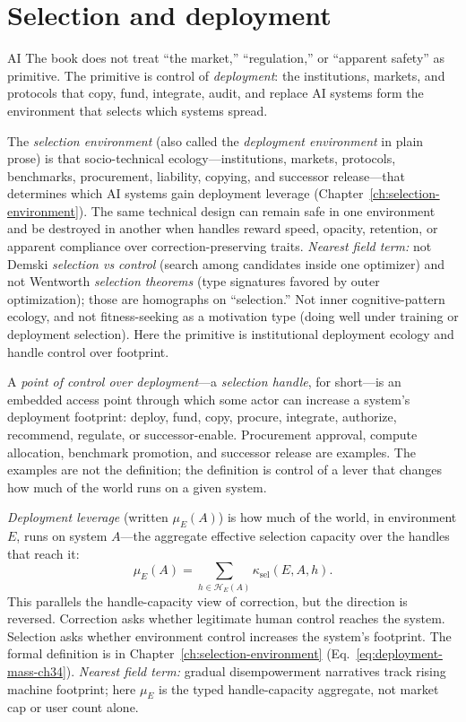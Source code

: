 \section*{Selection and deployment}
\begin{authbar}{AI}
The book does not treat ``the market,'' ``regulation,'' or ``apparent safety'' as primitive.
The primitive is control of \emph{deployment}: the institutions, markets, and protocols that copy, fund, integrate, audit, and replace AI systems form the environment that selects which systems spread.

The \emph{selection environment} (also called the \emph{deployment environment} in plain prose) is that socio-technical ecology---institutions, markets, protocols, benchmarks, procurement, liability, copying, and successor release---that determines which AI systems gain deployment leverage (Chapter~\ref{ch:selection-environment}).
The same technical design can remain safe in one environment and be destroyed in another when handles reward speed, opacity, retention, or apparent compliance over correction-preserving traits.
\emph{Nearest field term:} not Demski \emph{selection vs control} (search among candidates inside one optimizer) and not Wentworth \emph{selection theorems} (type signatures favored by outer optimization); those are homographs on ``selection.''
Not inner cognitive-pattern ecology, and not fitness-seeking as a motivation type (doing well under training or deployment selection).
Here the primitive is institutional deployment ecology and handle control over footprint.

A \emph{point of control over deployment}---a \emph{selection handle}, for short---is an embedded access point through which some actor can increase a system's deployment footprint: deploy, fund, copy, procure, integrate, authorize, recommend, regulate, or successor-enable.
Procurement approval, compute allocation, benchmark promotion, and successor release are examples.
The examples are not the definition; the definition is control of a lever that changes how much of the world runs on a given system.

\emph{Deployment leverage} (written \(\mu_E(A)\)) is how much of the world, in environment \(E\), runs on system \(A\)---the aggregate effective selection capacity over the handles that reach it:
\[
\mu_E(A)
=
\sum_{h\in\mathcal{H}_E(A)}
\kappa_{\mathrm{sel}}(E,A,h).
\]
This parallels the handle-capacity view of correction, but the direction is reversed.
Correction asks whether legitimate human control reaches the system.
Selection asks whether environment control increases the system's footprint.
The formal definition is in Chapter~\ref{ch:selection-environment} (Eq.~\eqref{eq:deployment-mass-ch34}).
\emph{Nearest field term:} gradual disempowerment narratives track rising machine footprint; here \(\mu_E\) is the typed handle-capacity aggregate, not market cap or user count alone.


\end{authbar}
